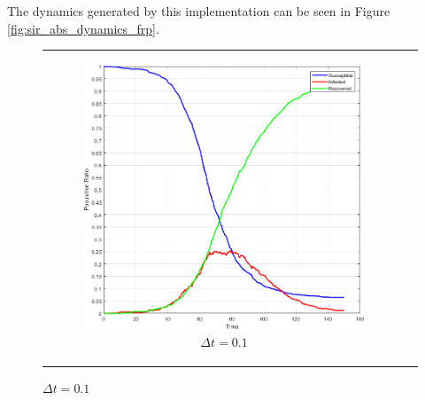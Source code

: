 The dynamics generated by this implementation can be seen in Figure \ref{fig:sir_abs_dynamics_frp}. 

\begin{figure}
\begin{center}
	\begin{tabular}{c c}
		\begin{subfigure}[b]{0.4\textwidth}
			\centering
			\includegraphics[width=1\textwidth, angle=0]{./fig/timedriven/SIR_Yampa/SIR_Yampa_dt01.png}
			\caption{$\Delta t = 0.1$}
			\label{fig:sir_abs_approximating_01dt_1000agents}
		\end{subfigure}
		
		&
    	

\end{tabular}
\end{center}
\end{figure}
